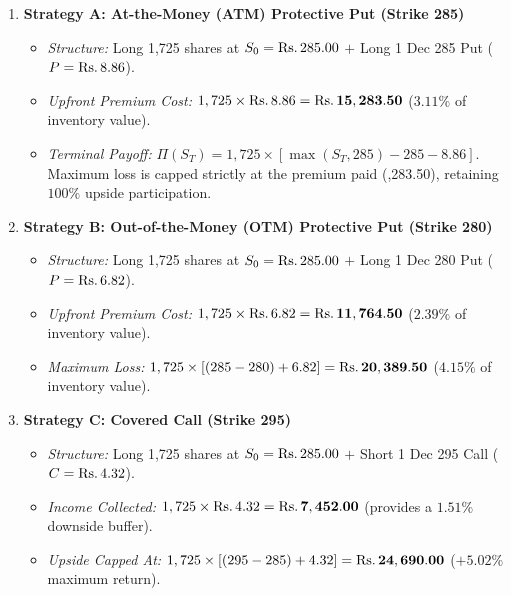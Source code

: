 \begin{enumerate}[leftmargin=1.5em, itemsep=1.5pt, parsep=0pt, label=\textbf{\arabic*.}]
    \item \textbf{Strategy A: At-the-Money (ATM) Protective Put (Strike 285)}
    \begin{itemize}[leftmargin=1.2em, itemsep=0.5pt, parsep=0pt]
        \item \textit{Structure:} Long 1,725 shares at $S_0 = \text{\text{Rs.}\,}285.00$ $+$ Long 1 Dec 285 Put ($P = \text{\text{Rs.}\,}8.86$).
        \item \textit{Upfront Premium Cost:} $1,725 \times \text{\text{Rs.}\,}8.86 = \mathbf{\text{\text{Rs.}\,}15,283.50}$ ($3.11\%$ of inventory value).
        \item \textit{Terminal Payoff:} $\Pi(S_T) = 1,725 \times [\max(S_T, 285) - 285 - 8.86]$. Maximum loss is capped strictly at the premium paid (,283.50), retaining $100\%$ upside participation.
    \end{itemize}
    \item \textbf{Strategy B: Out-of-the-Money (OTM) Protective Put (Strike 280)}
    \begin{itemize}[leftmargin=1.2em, itemsep=0.5pt, parsep=0pt]
        \item \textit{Structure:} Long 1,725 shares at $S_0 = \text{\text{Rs.}\,}285.00$ $+$ Long 1 Dec 280 Put ($P = \text{\text{Rs.}\,}6.82$).
        \item \textit{Upfront Premium Cost:} $1,725 \times \text{\text{Rs.}\,}6.82 = \mathbf{\text{\text{Rs.}\,}11,764.50}$ ($2.39\%$ of inventory value).
        \item \textit{Maximum Loss:} $1,725 \times [(285 - 280) + 6.82] = \mathbf{\text{\text{Rs.}\,}20,389.50}$ ($4.15\%$ of inventory value).
    \end{itemize}
    \item \textbf{Strategy C: Covered Call (Strike 295)}
    \begin{itemize}[leftmargin=1.2em, itemsep=0.5pt, parsep=0pt]
        \item \textit{Structure:} Long 1,725 shares at $S_0 = \text{\text{Rs.}\,}285.00$ $+$ Short 1 Dec 295 Call ($C = \text{\text{Rs.}\,}4.32$).
        \item \textit{Income Collected:} $1,725 \times \text{\text{Rs.}\,}4.32 = \mathbf{\text{\text{Rs.}\,}7,452.00}$ (provides a $1.51\%$ downside buffer).
        \item \textit{Upside Capped At:} $1,725 \times [(295 - 285) + 4.32] = \mathbf{\text{\text{Rs.}\,}24,690.00}$ ($+5.02\%$ maximum return).
    \end{itemize}

\end{enumerate}
